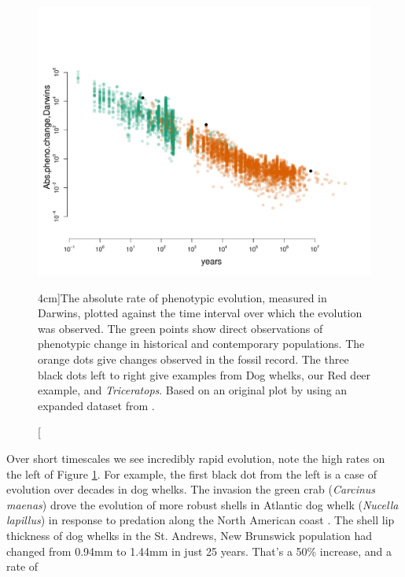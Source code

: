 \begin{figure}
  \begin{center}
    \includegraphics[width= \textwidth]{Journal_figs/Quant_gen/Uyeda_evol_rates/Uyeda_evol_rates.pdf}
\end{center}
\caption[][4cm]{The absolute rate of phenotypic evolution, measured in
  Darwins, plotted against the time interval over which the evolution
  was observed. The green points show direct observations of
  phenotypic change in historical and contemporary populations. The
  orange dots give changes observed in the fossil record. The three
  black dots left to right give examples from Dog whelks, our Red deer example, and  {\it Triceratops}. Based on an original plot by
  \citet{gingerich1983rates} using an expanded dataset from
  \citet{uyeda2011million}. } \label{fig:uyeda_gingerich}  
\end{figure}
Over short timescales we see incredibly rapid evolution, note the high
rates on the left of Figure \ref{fig:uyeda_gingerich}.
For example, the first black dot from the left is a case of evolution
over decades in dog whelks. The invasion the green crab ({\it Carcinus maenas})
drove the evolution of more robust shells in Atlantic dog
whelk ({\it Nucella lapillus}) in response to predation
along the North American coast \citep{vermeij1982phenotypic}. The shell lip thickness of dog whelks
in the St. Andrews, New Brunswick population had changed from 0.94mm
to 1.44mm in just 25 years. That's a 50\% increase, and a rate of
